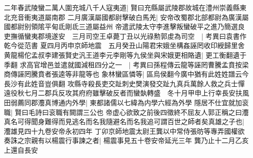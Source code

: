 二年春武陵蠻二萬人圍充城八千人寇夷道|{
	賢曰充縣屬武陵郡故城在澧州崇義縣東北充音衝夷道屬南郡}
二月廣漢屬國都尉擊破白馬羌|{
	安帝改蜀郡北部都尉為廣漢屬國都尉别領隂平甸氐剛氐三道屬益州}
帝遣武陵太守李進擊叛蠻破平之進乃簡選良吏撫循蠻夷郡境遂安　三月司空王卓薨丁丑以光祿勲郭䖍為司空　|{
	考異曰袁書作乾今從范書}
夏四月丙申京師地震　五月癸丑山陽君宋娥坐構姦誣罔收印綬歸里舍黄龍楊佗孟叔李建張賢史汎王道李元李剛等九侯坐與宋娥更相賂遺|{
	更工衡翻遺于季翻}
求高官增邑並遣就國減租四分之一　|{
	考異曰孫程傳云龍等誣罔曹騰孟賁按梁商傳誣罔騰賁者張逵等非龍等也}
象林蠻區憐等|{
	區烏侯翻今廣中猶有此姓姓譜云今長沙有此姓音豈俱翻}
攻縣寺殺長吏交趾刺史樊演發交趾九真兵萬餘人救之兵士憚遠役秋七月二郡兵反攻其府府雖擊破反者而蠻埶轉盛　冬十月甲申上行幸長安扶風田弱薦同郡灋真博通内外學|{
	東都諸儒以七緯為内學六經為外學}
隱居不仕宜就加衮職|{
	賢曰毛詩曰衮職有闕謂三公也}
帝虚心欲致之前後四徵終不屈友人郭正稱之曰灋真名可得聞身難得而見逃名而名我隨避名而名我追可謂百世之師者矣真雄之子也|{
	灋雄見四十九卷安帝永初四年}
丁卯京師地震太尉王龔以中常侍張昉等專弄國權欲奏誅之宗親有以楊震行事諫之者|{
	楊震事見五十卷安帝延光三年}
龔乃止十二月乙亥上還自長安


